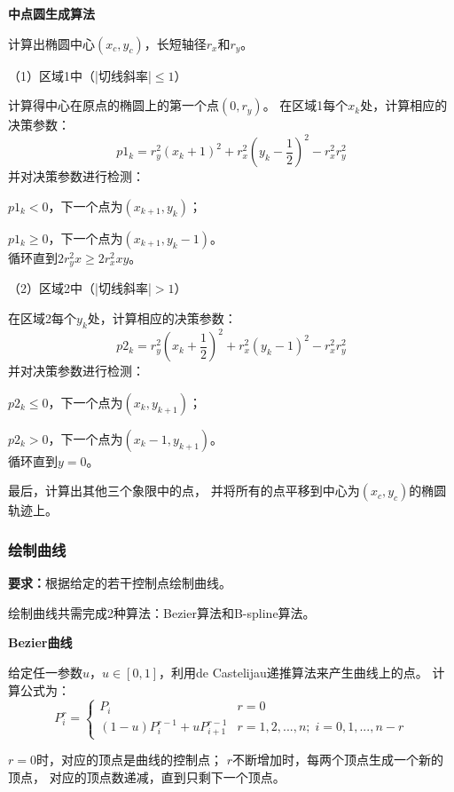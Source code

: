 \documentclass[a4paper,UTF8]{article}
\theoremstyle{definition}
\begin{document}
\textbf{中点圆生成算法}

计算出椭圆中心$(x_c,y_c)$，长短轴径$r_x$和$r_y$。

（1）区域1中（|切线斜率|$\leqslant 1$）

计算得中心在原点的椭圆上的第一个点$(0,r_y)$。
在区域1每个$x_k$处，计算相应的决策参数：
\begin{equation*}
    p1_{k}=r_y^2(x_k+1)^2+r_x^2(y_k-\frac{1}{2})^2-r_x^2r_y^2
\end{equation*}
并对决策参数进行检测：

$p1_k<0$，下一个点为$(x_{k+1},y_k)$；

$p1_k\geqslant 0$，下一个点为$(x_{k+1},y_k-1)$。
\\循环直到$2r_y^2x\geqslant 2r_x^2xy$。

（2）区域2中（|切线斜率|$>1$）

在区域2每个$y_k$处，计算相应的决策参数：
\begin{equation*}
    p2_{k}=r_y^2(x_k+\frac{1}{2})^2+r_x^2(y_k-1)^2-r_x^2r_y^2
\end{equation*}
并对决策参数进行检测：

$p2_k\leqslant 0$，下一个点为$(x_k,y_{k+1})$；

$p2_k>0$，下一个点为$(x_k-1,y_{k+1})$。
\\循环直到$y=0$。

最后，计算出其他三个象限中的点，
并将所有的点平移到中心为$(x_c,y_c)$的椭圆轨迹上。


\subsubsection{绘制曲线}
\textbf{要求：}根据给定的若干控制点绘制曲线。

绘制曲线共需完成2种算法：Bezier算法和B-spline算法。

\textbf{Bezier曲线}

给定任一参数$u$，$u\in [0,1]$，利用de Castelijau递推算法来产生曲线上的点。
计算公式为：
\begin{equation*}
    P_i^r=
    \begin{cases}
        P_i & r=0\\
        (1-u)P_i^{r-1}+uP_{i+1}^{r-1} & r=1,2,...,n;\; i=0,1,...,n-r
    \end{cases}
\end{equation*}

$r=0$时，对应的顶点是曲线的控制点；
$r$不断增加时，每两个顶点生成一个新的顶点，
对应的顶点数递减，直到只剩下一个顶点。
\end{document}
